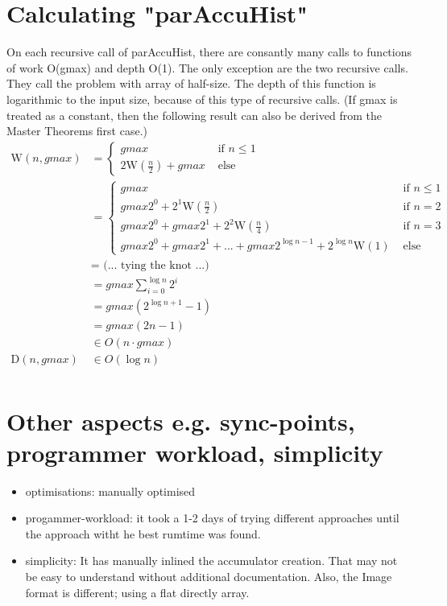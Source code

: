 \documentclass{article}
\newcommand{\W}[0]{\textrm{W}}
\newcommand{\D}[0]{\textrm{D}}
\begin{document}
    \section{Calculating "parAccuHist"}
      On each recursive call of parAccuHist, there are consantly
      many calls to functions of work O(gmax) and depth O(1).
      The only exception are the two recursive calls.
      They call the problem with array of half-size.
      The depth of this function is logarithmic to the input size,
      because of this type of recursive calls.
      (If gmax is treated as a constant, then the following result
      can also be derived from the Master Theorems first case.)
      \begin{equation}
      \begin{split}
      \W(n,gmax)
            & = \begin{cases}
                 gmax & \text{ if } n \le 1 \\ 
                 2 \W(\frac{n}{2}) + gmax & \text{ else }
                \end{cases} \\
            & = \begin{cases}
                  gmax & \text{ if } n \le 1 \\ 
                  gmax2^0 + 2^1\W(\frac{n}{2}) & \text{ if } n = 2 \\
                  gmax2^0 + gmax2^1 + 2^2\W(\frac{n}{4}) & \text{ if } n = 3 \\
                  gmax2^0 + gmax2^1 + ... + gmax 2^{\log n - 1} + 2^{\log n}\W(1) & \text{ else }
                \end{cases} \\
            & = \textrm{ (... tying the knot ...) } \\
            & = gmax \sum_{i=0}^{\log n}{2^i} \\
            & = gmax (2^{\log n + 1} - 1) \\
            & = gmax (2n - 1) \\
            & \in O(n \cdot gmax) \\
      \D(n,gmax)
          & \in O(\log n) \\
      \end{split}
      \end{equation}
    \section{Other aspects \small{e.g. sync-points, programmer workload, simplicity}}
      \begin{itemize}
        \item optimisations: manually optimised 
        \item progammer-workload: it took a 1-2 days of trying different approaches
                until the approach witht he best rumtime was found.
        \item simplicity:
          It has manually inlined the accumulator creation. That
          may not be easy to understand without additional documentation.
          Also, the Image format is different; using a flat directly array.
      \end{itemize}
      
\end{document}
